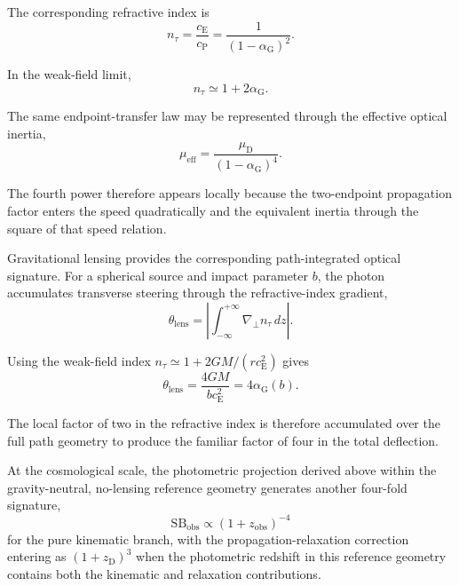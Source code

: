 The corresponding refractive index is
\begin{equation}
    n_\tau
    =
    \frac{c_{\mathrm E}}{c_{\mathrm P}}
    =
    \frac{1}{(1-\alpha_{\mathrm G})^2}.
\end{equation}

In the weak-field limit,
\begin{equation}
    n_\tau
    \simeq
    1+2\alpha_{\mathrm G}.
\end{equation}

The same endpoint-transfer law may be represented through the effective optical inertia,
\begin{equation}
    \mu_{\mathrm{eff}}
    =
    \frac{\mu_{\mathrm D}}
    {(1-\alpha_{\mathrm G})^4}.
\end{equation}

The fourth power therefore appears locally because the two-endpoint propagation factor enters the speed quadratically and the equivalent inertia through the square of that speed relation.

Gravitational lensing provides the corresponding path-integrated optical signature. For a spherical source and impact parameter $b$, the photon accumulates transverse steering through the refractive-index gradient,
\begin{equation}
    \theta_{\mathrm{lens}}
    =
    \left|
        \int_{-\infty}^{+\infty}
        \nabla_\perp n_\tau\,dz
    \right|.
\end{equation}

Using the weak-field index
$n_\tau\simeq1+2GM/(rc_{\mathrm E}^2)$
gives
\begin{equation}
    \theta_{\mathrm{lens}}
    =
    \frac{4GM}{bc_{\mathrm E}^2}
    =
    4\alpha_{\mathrm G}(b).
\end{equation}

The local factor of two in the refractive index is therefore accumulated over the full path geometry to produce the familiar factor of four in the total deflection.

At the cosmological scale, the photometric projection derived above within the gravity-neutral, no-lensing reference geometry generates another four-fold signature,
\begin{equation}
    \mathrm{SB}_{\mathrm{obs}}
    \propto
    (1+z_{\mathrm{obs}})^{-4}
\end{equation}
for the pure kinematic branch, with the propagation-relaxation correction entering as $(1+z_{\mathrm D})^3$ when the photometric redshift in this reference geometry contains both the kinematic and relaxation contributions.

